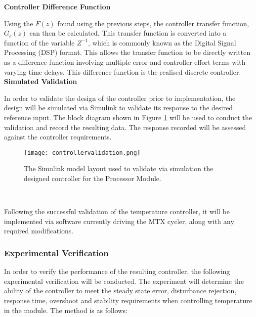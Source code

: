 \textbf{Controller Difference Function}

Using the $F(z)$ found using the previous steps, the controller transfer function, $G_c(z)$ can then be calculated. This transfer function is converted into a function of the variable $Z^{-1}$, which is commonly known as the Digital Signal Processing (DSP) format. This allows the transfer function to be directly written as a difference function involving multiple error and controller effort terms with varying time delays. This difference function is the realised discrete controller.\\

\textbf{Simulated Validation}

In order to validate the design of the controller prior to implementation, the design will be simulated via Simulink to validate its response to the desired reference input. The block diagram shown in Figure \ref{fig:controllervalidation} will be used to conduct the validation and record the resulting data. The response recorded will be assessed against the controller requirements.

\begin{figure}[!htb]
	\centering
	\texttt{[image: controllervalidation.png]}
	\caption[Controller valiation Simulink Model.]{The Simulink model layout used to validate via simulation the designed controller for the Processor Module.}
	\label{fig:controllervalidation}
\end{figure} 
\FloatBarrier

Following the successful validation of the temperature controller, it will be implemented via software currently driving the MTX cycler, along with any required modifications.


\subsubsection{Experimental Verification}
\label{sec:expver}

In order to verify the performance of the resulting controller, the following experimental verification will be conducted. The experiment will determine the ability of the controller to meet the steady state error, disturbance rejection, response time, overshoot and stability requirements when controlling temperature in the module. The method is as follows:

